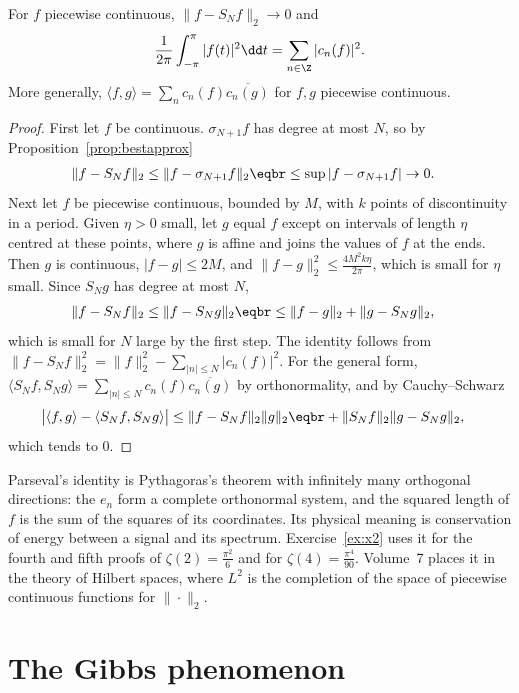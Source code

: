 \begin{theorem}[Parseval]\label{thm:parseval}
For $f$ piecewise continuous, $\|f-S_Nf\|_2\to0$ and
\[
\frac1{2\pi}\int_{-\pi}^\pi|f(t)|^2\dd t=\sum_{n\in\Z}|c_n(f)|^2.
\]
More generally, $\langle f,g\rangle=\sum_nc_n(f)\overline{c_n(g)}$ for $f,g$ piecewise continuous.
\end{theorem}
\begin{proof}
First let $f$ be continuous. $\sigma_{N+1}f$ has degree at most $N$, so by Proposition~\ref{prop:bestapprox}
\[
\begin{aligned}\|f-S_Nf\|_2&\le\|f-\sigma_{N+1}f\|_2\eqbr\le\sup|f-\sigma_{N+1}f|\to0.\end{aligned}
\]
Next let $f$ be piecewise continuous, bounded by $M$, with $k$ points of discontinuity in a period. Given $\eta>0$ small, let $g$
equal $f$ except on intervals of length $\eta$ centred at these points, where $g$ is affine and joins the values of $f$ at the
ends. Then $g$ is continuous, $|f-g|\le2M$, and $\|f-g\|_2^2\le\frac{4M^2k\eta}{2\pi}$, which is small for $\eta$ small. Since $S_Ng$ has
degree at most $N$,
\[
\begin{aligned}\|f-S_Nf\|_2&\le\|f-S_Ng\|_2\eqbr\le\|f-g\|_2+\|g-S_Ng\|_2,\end{aligned}
\]
which is small for $N$ large by the first step. The identity follows from $\|f-S_Nf\|_2^2=\|f\|_2^2-\sum_{|n|\le N}|c_n(f)|^2$. For the
general form, $\langle S_Nf,S_Ng\rangle=\sum_{|n|\le N}c_n(f)\overline{c_n(g)}$ by orthonormality, and by Cauchy--Schwarz
\[
\begin{aligned}\bigl|\langle f,g\rangle-\langle S_Nf,S_Ng\rangle\bigr|&\le\|f-S_Nf\|_2\|g\|_2\eqbr+\|S_Nf\|_2\|g-S_Ng\|_2,\end{aligned}
\]
which tends to $0$.
\end{proof}

Parseval's identity is Pythagoras's theorem with infinitely many orthogonal directions: the $e_n$ form a complete
orthonormal system, and the squared length of $f$ is the sum of the squares of its coordinates. Its physical meaning is
conservation of energy between a signal and its spectrum. Exercise~\ref{ex:x2} uses it for the fourth and fifth proofs of
$\zeta(2)=\frac{\pi^2}6$ and for $\zeta(4)=\frac{\pi^4}{90}$. Volume~7 places it in the theory of Hilbert spaces, where $L^2$ is the completion of
the space of piecewise continuous functions for $\|\cdot\|_2$.

\section{The Gibbs phenomenon}

